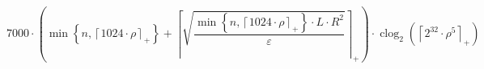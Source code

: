 \[7000 \cdot \left(\min\left\{ n, \left\lceil 1024 \cdot \rho \right\rceil_{+} \right\} + \left\lceil \sqrt{\frac{\min\left\{ n, \left\lceil 1024 \cdot \rho \right\rceil_{+} \right\} \cdot L \cdot R^{2}}{\varepsilon}} \right\rceil_{+}\right) \cdot \operatorname{clog}_{2}\left(\left\lceil 2^{32} \cdot \rho^{5} \right\rceil_{+}\right)\]
